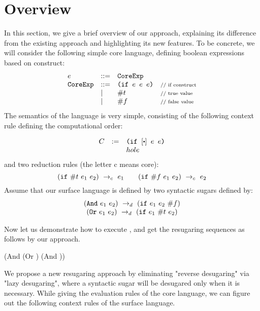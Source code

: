 \section{Overview}
\label{sec2}


In this section, we give a brief overview of our approach, explaining its difference from the existing  approach and highlighting its new features. To be concrete, we will consider the following simple core language, defining boolean expressions based on  construct:
\[
\begin{array}{lllll}
e &::=& \mbox{\tt CoreExp}\\
\mbox{\tt CoreExp} &::=& \texttt{(if~$e$~$e$~$e$)} &\mbox{{\scriptsize // if construct}}\\
& |& \#t  & \mbox{{\scriptsize // true value}}\\
& |& \#f & \mbox{{\scriptsize // false value}}
\end{array}
\]
The semantics of the language is very simple, consisting of the following context rule defining the computational order:

\[
\begin{array}{lcl}
C &:=& \Code{(if $[\bigcdot]$ $e$ $e$)}\\
&&hole\\
\end{array}
\]
and two reduction rules (the letter c means core):
\[
\centering
 \redc{(\m{if}~\true~e_1~e_2)}{e_1}  \qquad \redc{(\m{if}~\false~e_1~e_2)}{e_2} 
\]
Assume that our surface language is defined by two syntactic sugars defined by:
\[
\begin{array}{c}
(\mbox{\tt And}~e_1~e_2) ~\rightarrow_d~ (\mbox{\tt if}~e_1~e_2~\#f)\\
(\mbox{\tt Or}~e_1~e_2) ~\rightarrow_d~ (\mbox{\tt if}~e_1~\#t~e_2)
\end{array}
\]


Now let us demonstrate how to execute , and get the resugaring sequences as follows by our approach.


\begin{Codes}
    (And (Or \true \false) (And \false \true))
\end{Codes}



We propose a new resugaring approach by eliminating "reverse desugaring" via "lazy desugaring", where a syntactic sugar will be desugared only when it is necessary. While giving the evaluation rules of the core language, we can figure out the following context rules of the surface language.

